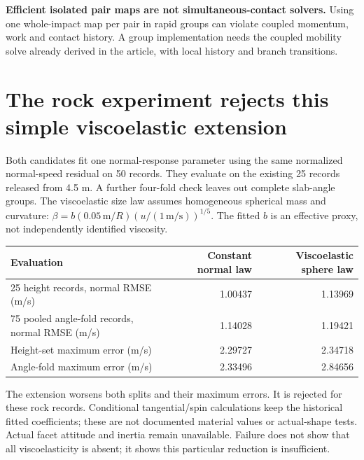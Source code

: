 \documentclass[10pt,a4paper]{article}
\begin{document}
\textbf{Efficient isolated pair maps are not simultaneous-contact solvers.}
Using one whole-impact map per pair in rapid groups can violate coupled momentum,
work and contact history. A group implementation needs the coupled mobility solve
already derived in the article, with local history and branch transitions.

\section*{The rock experiment rejects this simple viscoelastic extension}
Both candidates fit one normal-response parameter using the same normalized
normal-speed residual on 50 records. They evaluate on the existing 25 records
released from 4.5 m. A further four-fold check leaves out complete slab-angle groups.
The viscoelastic size law assumes homogeneous spherical mass and curvature:
$\beta=b(0.05\,\mathrm m/R)(u/(1\,\mathrm{m/s}))^{1/5}$.
The fitted $b$ is an effective proxy, not independently identified viscosity.

\begin{center}\small
\begin{tabular}{lrr}\hline
Evaluation & Constant normal law & Viscoelastic sphere law\\\hline
25 height records, normal RMSE (m/s) & 1.00437 & 1.13969\\
75 pooled angle-fold records, normal RMSE (m/s) & 1.14028 & 1.19421\\
Height-set maximum error (m/s) & 2.29727 & 2.34718\\
Angle-fold maximum error (m/s) & 2.33496 & 2.84656\\\hline
\end{tabular}\end{center}
The extension worsens both splits and their maximum errors. It is rejected for
these rock records. Conditional tangential/spin calculations keep the historical
fitted coefficients; these are not documented material values or actual-shape tests.
Actual facet attitude and inertia remain unavailable. Failure does not show that
all viscoelasticity is absent; it shows this particular reduction is insufficient.

\newpage
\end{document}
